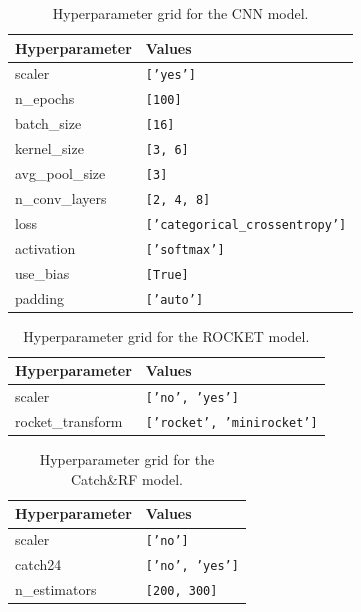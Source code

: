 \documentclass[a4paper,11pt]{article}
\begin{document}
\begin{table}[htbp]
    \centering
    \begin{tabular}{|l|l|}
        \hline
        \textbf{Hyperparameter} & \textbf{Values} \\
        \hline
        scaler & \texttt{['yes']} \\
        n\_epochs & \texttt{[100]} \\
        batch\_size & \texttt{[16]} \\
        kernel\_size & \texttt{[3, 6]} \\
        avg\_pool\_size & \texttt{[3]} \\
        n\_conv\_layers & \texttt{[2, 4, 8]} \\
        loss & \texttt{['categorical\_crossentropy']} \\
        activation & \texttt{['softmax']} \\
        use\_bias & \texttt{[True]} \\
        padding & \texttt{['auto']} \\
        \hline
    \end{tabular}
    \caption{Hyperparameter grid for the CNN model.}
    \label{tab:cnn}
\end{table}

\begin{table}[htbp]
    \centering
    \begin{tabular}{|l|l|}
        \hline
        \textbf{Hyperparameter} & \textbf{Values} \\
        \hline
        scaler & \texttt{['no', 'yes']} \\
        rocket\_transform & \texttt{['rocket', 'minirocket']} \\
        \hline
    \end{tabular}
    \caption{Hyperparameter grid for the ROCKET model.}
    \label{tab:rocket}
\end{table}

\begin{table}[htbp]
    \centering
    \begin{tabular}{|l|l|}
        \hline
        \textbf{Hyperparameter} & \textbf{Values} \\
        \hline
        scaler & \texttt{['no']} \\
        catch24 & \texttt{['no', 'yes']} \\
        n\_estimators & \texttt{[200, 300]} \\
        \hline
    \end{tabular}
    \caption{Hyperparameter grid for the Catch\&RF model.}
    \label{tab:catch22}
\end{table}
\end{document}
